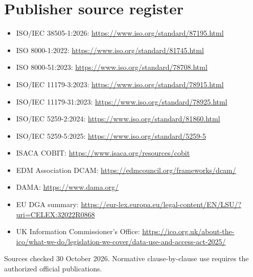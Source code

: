 \documentclass[11pt,letterpaper]{article}
\begin{document}
\section{Publisher source register}
\begin{itemize}
\item ISO/IEC 38505-1:2026: \url{https://www.iso.org/standard/87195.html}
\item ISO 8000-1:2022: \url{https://www.iso.org/standard/81745.html}
\item ISO 8000-51:2023: \url{https://www.iso.org/standard/78708.html}
\item ISO/IEC 11179-3:2023: \url{https://www.iso.org/standard/78915.html}
\item ISO/IEC 11179-31:2023: \url{https://www.iso.org/standard/78925.html}
\item ISO/IEC 5259-2:2024: \url{https://www.iso.org/standard/81860.html}
\item ISO/IEC 5259-5:2025: \url{https://www.iso.org/standard/5259-5}
\item ISACA COBIT: \url{https://www.isaca.org/resources/cobit}
\item EDM Association DCAM: \url{https://edmcouncil.org/frameworks/dcam/}
\item DAMA: \url{https://www.dama.org/}
\item EU DGA summary: \url{https://eur-lex.europa.eu/legal-content/EN/LSU/?uri=CELEX:32022R0868}
\item UK Information Commissioner's Office: \url{https://ico.org.uk/about-the-ico/what-we-do/legislation-we-cover/data-use-and-access-act-2025/}
\end{itemize}
Sources checked 30 October 2026. Normative clause-by-clause use requires the authorized official publications.
\end{document}
